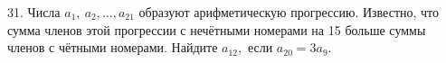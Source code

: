 31. Числа $a_1,\ a_2,\ldots,a_{21}$ образуют арифметическую прогрессию. Известно, что сумма членов этой прогрессии с нечётными номерами на 15 больше суммы членов с чётными номерами. Найдите $a_{12},$ если $a_{20}=3a_9.$\\
